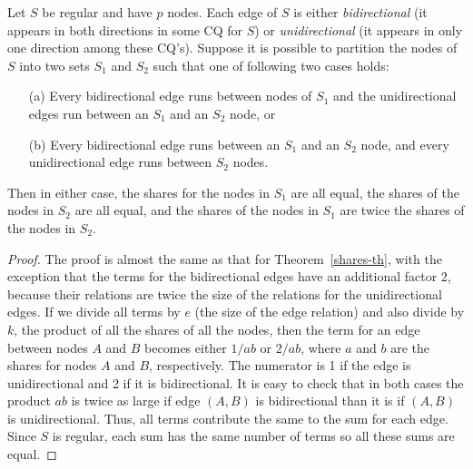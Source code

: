 \begin{theorem}\label{shares2-th}
Let $S$ be regular and have $p$ nodes.  Each edge of $S$ is either {\em bidirectional} (it appears in both directions in some CQ for $S$) or {\em unidirectional} (it appears in only one direction among these CQ's).
Suppose it is possible to partition the nodes of $S$ into two sets $S_1$ and $S_2$ such that one of following two cases holds:

\begin{itemize}
\item[(a)]
Every bidirectional edge runs between nodes of $S_1$ and the
unidirectional edges run between an $S_1$ and an $S_2$ node, or

\item[(b)]
Every bidirectional edge runs between an $S_1$ and an $S_2$ node, and
every unidirectional edge runs between $S_2$ nodes.
\end{itemize}

Then in either case, the shares for the nodes in $S_1$ are all equal, the shares of the nodes in $S_2$ are all equal, and the shares of the nodes in $S_1$ are twice the shares of the nodes in $S_2$.
\end{theorem}

\begin{proof}
The proof is almost the same as that for Theorem~\ref{shares-th}, with the exception that the terms for the bidirectional edges have an additional factor 2, because their relations are twice the size of the relations for the unidirectional edges.  If we divide all terms by $e$ (the size of the edge relation) and also divide by $k$, the product of all the shares of all the nodes, then the term for an edge between nodes $A$ and $B$ becomes either $1/ab$ or $2/ab$, where $a$ and $b$ are the shares for nodes $A$ and $B$, respectively.  The numerator is 1 if the edge is unidirectional and 2 if it is bidirectional.  It is easy to check that in both cases the product $ab$ is twice as large if edge $(A,B)$ is bidirectional than it is if $(A,B)$ is unidirectional.
Thus, all terms contribute the same to the sum for each edge.
Since $S$ is regular, each sum has the same number of terms so all these sums are equal.
\end{proof}

